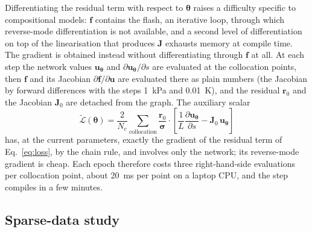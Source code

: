 \documentclass[a4paper,fleqn]{cas-sc}
\newcommand{\bu}{\mathbf{u}}
\newcommand{\bJ}{\mathbf{J}}
\newcommand{\br}{\mathbf{r}}
\newcommand{\btheta}{\boldsymbol{\theta}}
\begin{document}
Differentiating the residual term with respect to $\btheta$ raises a difficulty specific to compositional models: $\mathbf{f}$ contains the flash, an iterative loop, through which reverse-mode differentiation is not available, and a second level of differentiation on top of the linearisation that produces $\bJ$ exhausts memory at compile time. The gradient is obtained instead without differentiating through $\mathbf{f}$ at all. At each step the network values $\bu_{\btheta}$ and $\partial\bu_{\btheta}/\partial s$ are evaluated at the collocation points, then $\mathbf{f}$ and its Jacobian $\partial\mathbf{f}/\partial\bu$ are evaluated there as plain numbers (the Jacobian by forward differences with the steps \SI{1}{\kilo\pascal} and \SI{0.01}{\kelvin}), and the residual $\br_0$ and the Jacobian $\mathbf{J}_0$ are detached from the graph. The auxiliary scalar
\begin{equation}\label{eq:surrogate_loss}
\tilde{\mathcal{L}}(\btheta) = \frac{2}{N_c}\sum_{\text{collocation}} \frac{\br_0}{\boldsymbol{\sigma}}\cdot\left[\frac{1}{L}\frac{\partial\bu_{\btheta}}{\partial s} - \mathbf{J}_0\,\bu_{\btheta}\right]
\end{equation}
has, at the current parameters, exactly the gradient of the residual term of Eq.~\eqref{eq:loss}, by the chain rule, and involves only the network; its reverse-mode gradient is cheap. Each epoch therefore costs three right-hand-side evaluations per collocation point, about \SI{20}{\milli\second} per point on a laptop CPU, and the step compiles in a few minutes.

\subsection{Sparse-data study}\label{sec:pinn_results}
\end{document}

